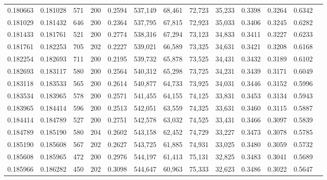 \begin{tabular}{rrrrrrrrrrrrr}
0.180663 & 0.181028 &    571 & 200 &                                     0.2594 & 537,149 &  68,461 &  72,723 &  35,233 & 0.3398 & 0.3264 & 0.6342 \\
0.181029 & 0.181432 &    646 & 200 &                                     0.2364 & 537,795 &  67,815 &  72,923 &  35,033 & 0.3406 & 0.3245 & 0.6282 \\
0.181433 & 0.181761 &    521 & 200 &                                     0.2774 & 538,316 &  67,294 &  73,123 &  34,833 & 0.3411 & 0.3227 & 0.6233 \\
0.181761 & 0.182253 &    705 & 202 &                                     0.2227 & 539,021 &  66,589 &  73,325 &  34,631 & 0.3421 & 0.3208 & 0.6168 \\
0.182254 & 0.182693 &    711 & 200 &                                     0.2195 & 539,732 &  65,878 &  73,525 &  34,431 & 0.3432 & 0.3189 & 0.6102 \\
0.182693 & 0.183117 &    580 & 200 &                                     0.2564 & 540,312 &  65,298 &  73,725 &  34,231 & 0.3439 & 0.3171 & 0.6049 \\
0.183118 & 0.183533 &    565 & 200 &                                     0.2614 & 540,877 &  64,733 &  73,925 &  34,031 & 0.3446 & 0.3152 & 0.5996 \\
0.183534 & 0.183965 &    578 & 200 &                                     0.2571 & 541,455 &  64,155 &  74,125 &  33,831 & 0.3453 & 0.3134 & 0.5943 \\
0.183965 & 0.184414 &    596 & 200 &                                     0.2513 & 542,051 &  63,559 &  74,325 &  33,631 & 0.3460 & 0.3115 & 0.5887 \\
0.184414 & 0.184789 &    527 & 200 &                                     0.2751 & 542,578 &  63,032 &  74,525 &  33,431 & 0.3466 & 0.3097 & 0.5839 \\
0.184789 & 0.185190 &    580 & 204 &                                     0.2602 & 543,158 &  62,452 &  74,729 &  33,227 & 0.3473 & 0.3078 & 0.5785 \\
0.185190 & 0.185608 &    567 & 202 &                                     0.2627 & 543,725 &  61,885 &  74,931 &  33,025 & 0.3480 & 0.3059 & 0.5732 \\
0.185608 & 0.185965 &    472 & 200 &                                     0.2976 & 544,197 &  61,413 &  75,131 &  32,825 & 0.3483 & 0.3041 & 0.5689 \\
0.185966 & 0.186282 &    450 & 202 &                                     0.3098 & 544,647 &  60,963 &  75,333 &  32,623 & 0.3486 & 0.3022 & 0.5647 \\

\end{tabular}
